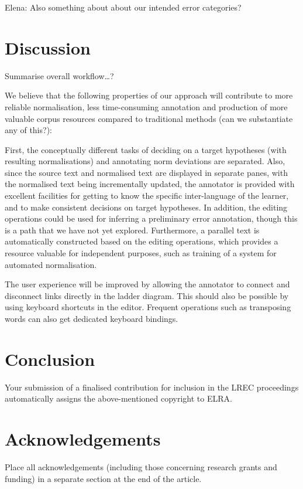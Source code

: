\documentclass[10pt, a4paper]{article}
\begin{document}
Elena: Also something about about our intended error categories?

\section{Discussion}

Summarise overall workflow\ldots ?

We believe that the following properties of our approach will contribute to more reliable normalisation, less time-consuming annotation and production of more valuable corpus resources compared to traditional methods (can we substantiate any of this?):

First, the conceptually different tasks of deciding on a target hypotheses (with resulting normalisations) and annotating norm deviations are separated. Also, since the source text and normalised text are displayed in separate panes, with the normalised text being incrementally updated, the annotator is provided with excellent facilities for getting to know the specific inter-language of the learner, and to make consistent decisions on target hypotheses. In addition, the editing operations could be used for inferring a preliminary error annotation, though this is a path that we have not yet explored. Furthermore, a parallel text is automatically constructed based on the editing operations, which provides a resource valuable for independent purposes, such as training of a system for automated normalisation.

The user experience will be improved by allowing the annotator to connect
and disconnect links directly in the ladder diagram. This should also be
possible by using keyboard shortcuts in the editor.  Frequent operations
such as transposing words can also get dedicated keyboard bindings.

\section{Conclusion}

Your submission of a finalised contribution for inclusion in the LREC
proceedings automatically assigns the above-mentioned copyright to ELRA.

\section{Acknowledgements}

Place all acknowledgements (including those concerning research grants and
funding) in a separate section at the end of the article.
\end{document}

